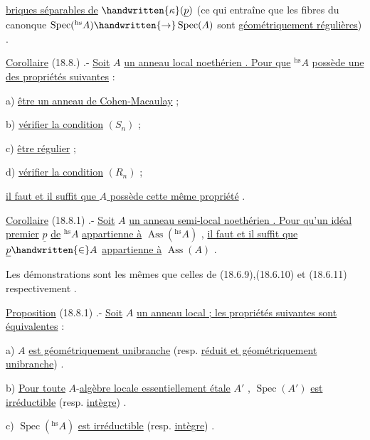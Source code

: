 
\uline{briques séparables de} $\handwritten{\kappa}(\underline p)$ (ce qui entraîne que les fibres du  canonque $\operatorname{Spec}({}^{\mathrm{hs}}A)\handwritten{\to}\operatorname{Spec}(A)$ sont \uline{géométriquement régulières}) .

\uline{Corollaire} (18.8.) .- \uline{Soit} $A$ \uline{un anneau local noethérien . Pour que} $ {}^{\mathrm{hs}}A$ \uline{possède une des propriétés suivantes}\deleted{\unsure{,}} :

a) \uline{être un anneau de Cohen-Macaulay} ;

b) \uline{vérifier la condition} $(S_n)$ ;

c) \uline{être régulier} ;

d) \uline{vérifier la condition} $(R_n)$ ; 

\uline{il faut et il suffit que $A$ possède cette même propriété} .

\uline{Corollaire} (18.8.1) .- \uline{Soit} $A$ \uline{un anneau semi-local noethérien . Pour qu'un idéal premier} $\underline p$ \uline{de} $ {}^{\mathrm{hs}}A$ \uline{appartienne à} $\operatorname{Ass}({}^{\mathrm{hs}}A)$ , \uline{il faut et il suffit que} $\underline p\handwritten{\in} A$ \uline{appartienne à} $\operatorname{Ass}(A)$ .

Les démonstrations sont les mêmes que celles de (18.6.9),(18.6.10) et (18.6.11) respectivement .

\uline{Proposition} (18.8.1) .- \uline{Soit} $A$ \uline{un anneau local ; les propriétés suivantes sont équivalentes} :

a) $A$ \uline{est géométriquement unibranche} (resp. \uline{réduit et géométriquement unibranche}) .

b) \uline{Pour toute} $A$-\uline{algèbre locale essentiellement étale} $A'$ , $\operatorname{Spec}(A')$ \uline{est irréductible} (resp. \uline{intègre}) .

c) $\operatorname{Spec}({}^{\mathrm{hs}}A)$ \uline{est irréductible} (resp. \uline{intègre}) .

